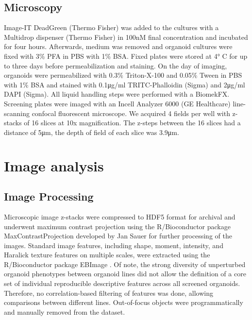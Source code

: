 \begin{flushleft}
\subsection{Microscopy}
Image-IT DeadGreen (Thermo Fisher) was added to the cultures with a Multidrop dispenser (Thermo Fisher) in 100nM final concentration and incubated for four hours. Afterwards, medium was removed and organoid cultures were fixed with 3\% PFA in PBS with 1\% BSA. Fixed plates were stored at 4° C for up to three days before permeabilization and staining. On the day of imaging, organoids were permeabilized with 0.3\% Triton-X-100 and 0.05\% Tween in PBS with 1\% BSA and stained with 0.1μg/ml TRITC-Phalloidin (Sigma) and 2μg/ml DAPI (Sigma). All liquid handling steps were performed with a BiomekFX. Screening plates were imaged with an Incell Analyzer 6000 (GE Healthcare) line-scanning confocal fluorescent microscope. We acquired 4 fields per well with z-stacks of 16 slices at 10x magnification. The z-steps between the 16 slices had a distance of 5μm, the depth of field of each slice was 3.9μm.

\section{Image analysis}

\subsection{Image Processing}
Microscopic image z-stacks were compressed to HDF5 format for archival and underwent maximum contrast projection using the R/Bioconductor package MaxContrastProjection developed by Jan Sauer for further processing of the images. Standard image features, including shape, moment, intensity, and Haralick texture features on multiple scales, were extracted using the R/Bioconductor package EBImage \cite{Pau2010-gg}. Of note, the strong diversity of unperturbed organoid phenotypes between organoid lines did not allow the definition of a core set of individual reproducible descriptive features across all screened organoids. Therefore, no correlation-based filtering of features was done, allowing comparisons between different lines. Out-of-focus objects were programmatically and manually removed from the dataset.


\end{flushleft}
